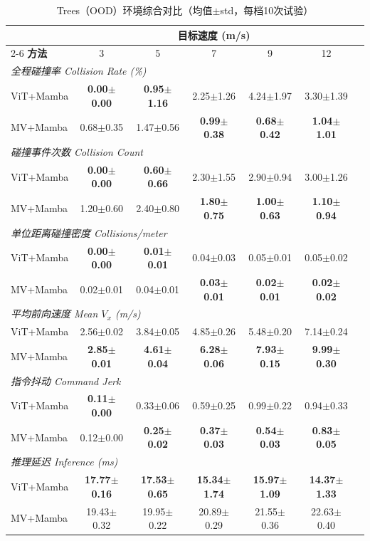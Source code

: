 \begin{table}[!htbp]
\centering
\caption{Trees（OOD）环境综合对比（均值$\pm$std，每档10次试验）}
\label{tab:ch5_trees_full}
\begin{tabular}{lcccccc}
\toprule
 & \multicolumn{5}{c}{\textbf{目标速度 (m/s)}} \\
\cmidrule(lr){2-6}
\textbf{方法} & 3 & 5 & 7 & 9 & 12 \\
\midrule
\multicolumn{6}{l}{\textit{全程碰撞率 Collision Rate (\%)}} \\
ViT+Mamba & \textbf{0.00$\pm$0.00} & \textbf{0.95$\pm$1.16} & 2.25$\pm$1.26 & 4.24$\pm$1.97 & 3.30$\pm$1.39 \\
MV+Mamba & 0.68$\pm$0.35 & 1.47$\pm$0.56 & \textbf{0.99$\pm$0.38} & \textbf{0.68$\pm$0.42} & \textbf{1.04$\pm$1.01} \\
\midrule
\multicolumn{6}{l}{\textit{碰撞事件次数 Collision Count}} \\
ViT+Mamba & \textbf{0.00$\pm$0.00} & \textbf{0.60$\pm$0.66} & 2.30$\pm$1.55 & 2.90$\pm$0.94 & 3.00$\pm$1.26 \\
MV+Mamba & 1.20$\pm$0.60 & 2.40$\pm$0.80 & \textbf{1.80$\pm$0.75} & \textbf{1.00$\pm$0.63} & \textbf{1.10$\pm$0.94} \\
\midrule
\multicolumn{6}{l}{\textit{单位距离碰撞密度 Collisions/meter}} \\
ViT+Mamba & \textbf{0.00$\pm$0.00} & \textbf{0.01$\pm$0.01} & 0.04$\pm$0.03 & 0.05$\pm$0.01 & 0.05$\pm$0.02 \\
MV+Mamba & 0.02$\pm$0.01 & 0.04$\pm$0.01 & \textbf{0.03$\pm$0.01} & \textbf{0.02$\pm$0.01} & \textbf{0.02$\pm$0.02} \\
\midrule
\multicolumn{6}{l}{\textit{平均前向速度 Mean $V_x$ (m/s)}} \\
ViT+Mamba & 2.56$\pm$0.02 & 3.84$\pm$0.05 & 4.85$\pm$0.26 & 5.48$\pm$0.20 & 7.14$\pm$0.24 \\
MV+Mamba & \textbf{2.85$\pm$0.01} & \textbf{4.61$\pm$0.04} & \textbf{6.28$\pm$0.06} & \textbf{7.93$\pm$0.15} & \textbf{9.99$\pm$0.30} \\
\midrule
\multicolumn{6}{l}{\textit{指令抖动 Command Jerk}} \\
ViT+Mamba & \textbf{0.11$\pm$0.00} & 0.33$\pm$0.06 & 0.59$\pm$0.25 & 0.99$\pm$0.22 & 0.94$\pm$0.33 \\
MV+Mamba & 0.12$\pm$0.00 & \textbf{0.25$\pm$0.02} & \textbf{0.37$\pm$0.03} & \textbf{0.54$\pm$0.03} & \textbf{0.83$\pm$0.05} \\
\midrule
\multicolumn{6}{l}{\textit{推理延迟 Inference (ms)}} \\
ViT+Mamba & \textbf{17.77$\pm$0.16} & \textbf{17.53$\pm$0.65} & \textbf{15.34$\pm$1.74} & \textbf{15.97$\pm$1.09} & \textbf{14.37$\pm$1.33} \\
MV+Mamba & 19.43$\pm$0.32 & 19.95$\pm$0.22 & 20.89$\pm$0.29 & 21.55$\pm$0.36 & 22.63$\pm$0.40 \\
\bottomrule
\end{tabular}
\end{table}
\FloatBarrier

